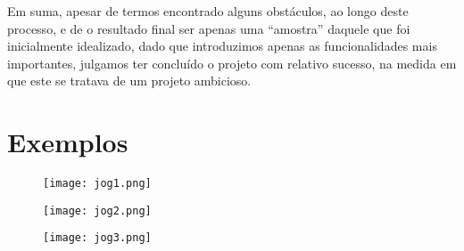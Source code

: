 \documentclass[11pt,a4paper]{report}
\begin{document}
Em suma, apesar de termos encontrado alguns obstáculos, ao longo deste processo, e de o resultado final ser apenas uma “amostra” daquele que foi inicialmente idealizado, dado que introduzimos apenas as funcionalidades mais importantes,  julgamos ter concluído o projeto com relativo sucesso, na medida em que este se tratava de um projeto ambicioso.

\appendix
\chapter{Exemplos}

\begin{figure}[h]
    \centering
    \texttt{[image: jog1.png]}
    \label{fig:jog1}
\end{figure}

\begin{figure}[h]
    \centering
    \texttt{[image: jog2.png]}
    \label{fig:jog2}
\end{figure}

\begin{figure}[h]
    \centering
    \texttt{[image: jog3.png]}
    \label{fig:jog3}
\end{figure}
\end{document}
